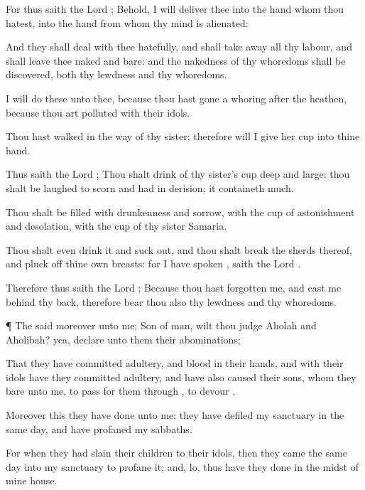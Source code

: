 {For thus
saith the
Lord
{}; Behold, I will
deliver thee into the
hand
{} whom thou
hatest, into the
hand
{} from whom thy
mind is
alienated:

And they shall
deal with thee
hatefully, and shall take
away all thy
labour, and shall
leave thee
naked and
bare: and the
nakedness of thy
whoredoms shall be
discovered, both thy
lewdness and thy
whoredoms.

I will
do these
{} unto thee, because thou hast gone a
whoring
after the
heathen,
{} because thou art
polluted with their
idols.

Thou hast
walked in the
way of thy
sister; therefore will I
give her
cup into thine
hand.

Thus
saith the
Lord
{}; Thou shalt
drink of thy
sister’s
cup
deep and
large: thou shalt be laughed to
scorn and had in
derision; it
containeth
much.

Thou shalt be
filled with
drunkenness and
sorrow, with the
cup of
astonishment and
desolation, with the
cup of thy
sister
Samaria.

Thou shalt even
drink it and suck
{}
out, and thou shalt
break the
sherds thereof, and pluck
off thine own
breasts: for I have
spoken
{},
saith the
Lord
{}.

Therefore thus
saith the
Lord
{}; Because thou hast
forgotten me, and
cast me
behind thy
back, therefore
bear thou also thy
lewdness and thy
whoredoms.


\par }{\PP {}¶ The
{}
said moreover unto me;
Son of
man, wilt thou
judge
Aholah and
Aholibah? yea,
declare unto them their
abominations;

That they have committed
adultery, and
blood
{} in their
hands, and with their
idols have they committed
adultery, and have also caused their
sons, whom they
bare unto me, to pass for them
through
{}, to
devour
{}.

Moreover this they have
done unto me: they have
defiled my
sanctuary in the same
day, and have
profaned my
sabbaths.

For when they had
slain their
children to their
idols, then they
came the same
day into my
sanctuary to
profane it; and, lo, thus have they
done in the
midst of mine
house.

}
